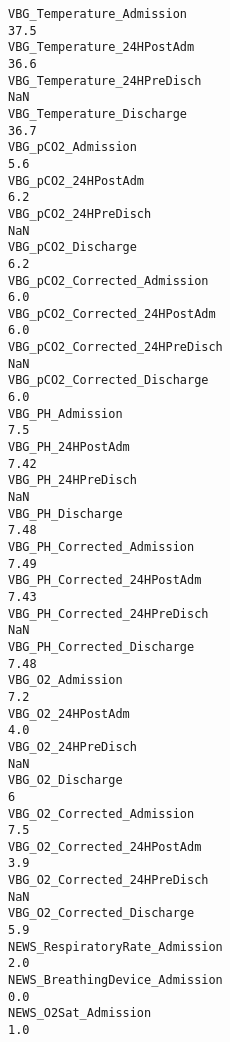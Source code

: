 \documentclass[hf]{ceurart}
\begin{document}
\begin{verbatim}
VBG_Temperature_Admission                                                        37.5
VBG_Temperature_24HPostAdm                                                       36.6
VBG_Temperature_24HPreDisch                                                       NaN
VBG_Temperature_Discharge                                                        36.7
VBG_pCO2_Admission                                                                5.6
VBG_pCO2_24HPostAdm                                                               6.2
VBG_pCO2_24HPreDisch                                                              NaN
VBG_pCO2_Discharge                                                                6.2
VBG_pCO2_Corrected_Admission                                                      6.0
VBG_pCO2_Corrected_24HPostAdm                                                     6.0
VBG_pCO2_Corrected_24HPreDisch                                                    NaN
VBG_pCO2_Corrected_Discharge                                                      6.0
VBG_PH_Admission                                                                  7.5
VBG_PH_24HPostAdm                                                                7.42
VBG_PH_24HPreDisch                                                                NaN
VBG_PH_Discharge                                                                 7.48
VBG_PH_Corrected_Admission                                                       7.49
VBG_PH_Corrected_24HPostAdm                                                      7.43
VBG_PH_Corrected_24HPreDisch                                                      NaN
VBG_PH_Corrected_Discharge                                                       7.48
VBG_O2_Admission                                                                  7.2
VBG_O2_24HPostAdm                                                                 4.0
VBG_O2_24HPreDisch                                                                NaN
VBG_O2_Discharge                                                                    6
VBG_O2_Corrected_Admission                                                        7.5
VBG_O2_Corrected_24HPostAdm                                                       3.9
VBG_O2_Corrected_24HPreDisch                                                      NaN
VBG_O2_Corrected_Discharge                                                        5.9
NEWS_RespiratoryRate_Admission                                                    2.0
NEWS_BreathingDevice_Admission                                                    0.0
NEWS_O2Sat_Admission                                                              1.0

\end{verbatim}
\end{document}
